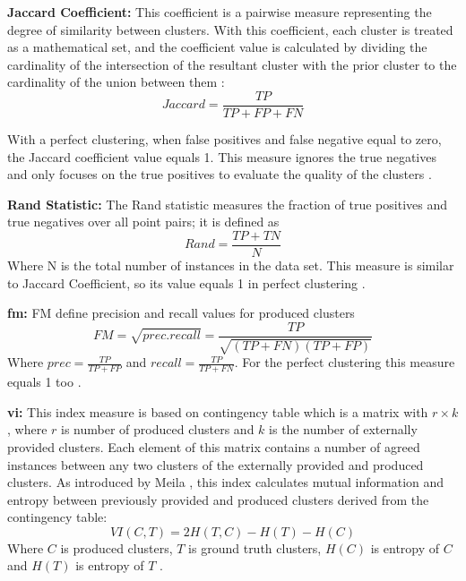 \textbf{Jaccard Coefficient: }
This coefficient is a pairwise measure representing the degree of similarity between clusters. With this coefficient, each cluster is treated as a mathematical set, and the coefficient value is calculated by dividing the cardinality of the intersection of the resultant cluster with the prior cluster to the cardinality of the union between them \cite{Vendramin2010}:
\begin{equation*}
Jaccard = \frac{TP}{TP + FP + FN}
\end{equation*}

With a perfect clustering, when false positives and false negative equal to zero, the Jaccard coefficient value equals 1. This measure ignores the true negatives and only focuses on the true positives to evaluate the quality of the clusters \cite{Zaki2014}. 

\textbf{Rand Statistic: }
The Rand statistic measures the fraction of true positives and true negatives over all point pairs; it is defined as
\begin{equation*}
Rand = \frac{TP + TN}{N}
\end{equation*}
Where N is the total number of instances in the data set. This measure is similar to Jaccard Coefficient, so its value equals 1 in perfect clustering \cite{Zaki2014}.


\textbf{\acrfull{fm}:}
FM define precision and recall values for produced clusters \cite{Fowlkes1983}
\begin{equation*}
FM = \sqrt{prec. recall} = \frac{TP}{\sqrt{(TP + FN)(TP + FP)}}
\end{equation*}
Where $prec = \frac{TP}{TP + FP}$ and $recall = \frac{TP}{TP + FN}$. For the perfect clustering this measure equals 1 too \cite{Zaki2014}.



\textbf{\acrfull{vi}: }
This index measure is based on contingency table which is a matrix with $r \times k$ , where $r$ is number of produced clusters and $k$ is the number of externally provided clusters. Each element of this matrix contains a number of agreed instances between any two clusters of the externally provided and produced clusters. As introduced by Meila \cite{Meila2007a}, this index calculates mutual information and entropy between previously provided and produced clusters derived from the contingency table:
\begin{equation*}
VI(C,T) = 2H(T,C)- H(T)- H(C)
\end{equation*}
Where $C$ is produced clusters, $T$ is ground truth clusters, $H(C)$ is entropy of $C$ and $H(T)$ is entropy of $T$ \cite{Zaki2014}.




